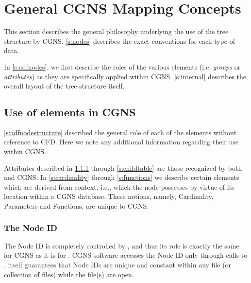 \section{General CGNS \SLL Mapping Concepts}
\label{s:general}
\thispagestyle{plain}

This section describes the general philosophy underlying the use of
the \HDF tree structure by CGNS. \autoref{s:nodes} describes the exact
conventions for each type of data.

In \autoref{s:adfnodes}, we first describe the roles of the various
\HDF elements (i.e. \emph{groups} or \emph{attributes}) as they
are specifically applied within CGNS. \autoref{s:internal} describes
the overall layout of the tree structure itself.

\subsection{Use of \HDF elements in CGNS}
\label{s:adfnodes}

\autoref{s:adfnodestructure} described the general role of each of
the \HDF elements without reference to CFD.  Here we note any
additional information regarding their use within CGNS.

Attributes described in \ref*{s:nodeid} through \ref*{s:childtable} are
those recognized by both \HDF and CGNS. In \ref*{s:cardinality} through
\ref*{s:functions} we describe certain elements which are
derived from context, i.e., which the node possesses by virtue of its
location within a CGNS database. These notions, namely, Cardinality,
Parameters and Functions, are unique to CGNS.

\subsubsection{The Node ID}
\label{s:nodeid}

The Node ID is completely controlled by \HDF, and thus its role is
exactly the same for CGNS as it is for \HDF. CGNS software accesses the
Node ID only through calls to \HDF. \HDF itself guarantees that Node IDs
are unique and constant within any \HDF file (or collection of files)
while the file(s) are open.


